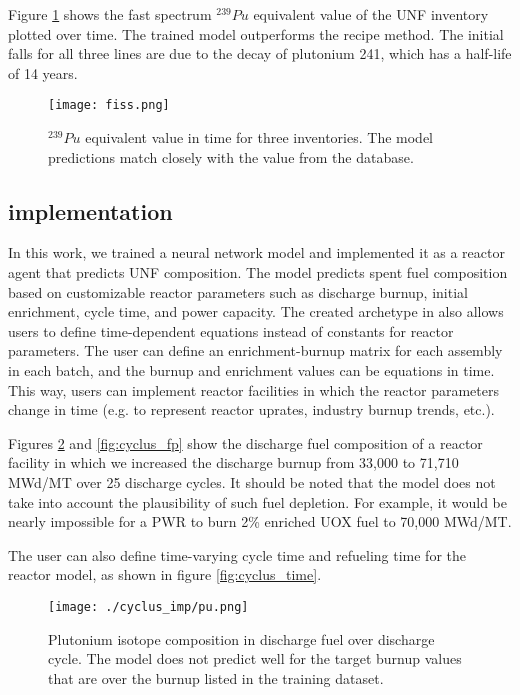 Figure \ref{fig:fiss} shows the fast spectrum $^{239}Pu$ equivalent
value of the \gls{UNF} inventory plotted over time.
The trained model outperforms the recipe method. The
initial falls for all three lines are due to the
decay of plutonium 241, which has a half-life of
14 years.


\begin{figure}
    \centering
    \texttt{[image: fiss.png]}
    \caption{$^{239}Pu$ equivalent value in time for three
             inventories. The model predictions match closely
             with the value from the database.}
    \label{fig:fiss}
\end{figure}




\subsection{\Cyclus implementation}

In this work, we trained a neural
network model and implemented it as a  \Cyclus reactor
agent that predicts \gls{UNF} composition. The model predicts spent
fuel composition
based on customizable reactor parameters such as
discharge burnup, initial enrichment, cycle time, and power
capacity. The created archetype in \Cyclus also allows users to define
time-dependent
equations instead of constants for reactor parameters.
The user can define an enrichment-burnup matrix for
each assembly in each batch, and the burnup and enrichment
values can be equations in time. This way, users can
implement reactor facilities in which the reactor parameters
change in time (e.g. to represent reactor uprates, industry
burnup trends, etc.).

Figures \ref{fig:cyclus_pu}
and \ref{fig:cyclus_fp} show the discharge fuel composition
of a reactor facility in which we increased the discharge burnup
from 33,000 to 71,710 MWd/MT over 25 discharge cycles.
It should be noted that the model does not take into account
the plausibility of such fuel depletion. For example, it
would be nearly impossible for a  \gls{PWR} to burn 2\%
enriched \gls{UOX} fuel to 70,000 MWd/MT.

The user can also define time-varying
cycle time and refueling time for the reactor model, as shown
in figure \ref{fig:cyclus_time}.


\begin{figure}
    \centering
    \texttt{[image: ./cyclus\_imp/pu.png]}
    \caption{Plutonium isotope composition in discharge fuel over discharge cycle. The model does not predict well for the target burnup values
    that are over the burnup listed in the training dataset.}
    \label{fig:cyclus_pu}
\end{figure}


